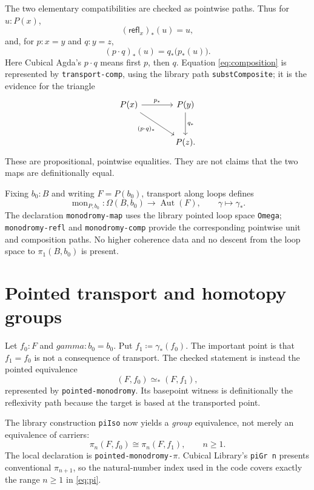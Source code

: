 \documentclass[11pt,reqno]{amsart}
\theoremstyle{mytheorem}
\theoremstyle{mydefinition}
\DeclareMathOperator{\Aut}{Aut}
\newcommand{\ag}[1]{\texttt{#1}}
\begin{document}
The two elementary compatibilities are checked as pointwise paths.  Thus for
$u:P(x)$,
\begin{equation}\label{eq:unit}
 (\mathsf{refl}_x)_*(u)=u,
\end{equation}
and, for $p:x=y$ and $q:y=z$,
\begin{equation}\label{eq:composition}
 (p\mathbin\cdot q)_*(u)=q_*\bigl(p_*(u)\bigr).
\end{equation}
Here Cubical Agda's $p\mathbin\cdot q$ means first $p$, then $q$.  Equation
\eqref{eq:composition} is represented by \ag{transport-comp}, using the
library path \ag{substComposite}; it is the evidence for the triangle
\[
\begin{tikzcd}[column sep=large,row sep=large]
 P(x) \arrow[r,"p_*"] \arrow[dr,"(p\cdot q)_*"'] & P(y) \arrow[d,"q_*"]\\
 & P(z).
\end{tikzcd}
\]
These are propositional, pointwise equalities.  They are not claims that the
two maps are definitionally equal.

Fixing $b_0:B$ and writing $F=P(b_0)$, transport along loops defines
\begin{equation}\label{eq:monodromy}
 \operatorname{mon}_{P,b_0}:\Omega(B,b_0)\longrightarrow\Aut(F),
 \qquad \gamma\longmapsto\gamma_*.
\end{equation}
The declaration \ag{monodromy-map} uses the library pointed loop space
\ag{Omega}; \ag{monodromy-refl} and \ag{monodromy-comp} provide the
corresponding pointwise unit and composition paths.  No higher coherence data
and no descent from the loop space to $\pi_1(B,b_0)$ is present.

\section{Pointed transport and homotopy groups}

Let $f_0:F$ and $gamma:b_0=b_0$.  Put $f_1\coloneqq\gamma_*(f_0)$.  The
important point is that $f_1=f_0$ is not a consequence of transport.  The
checked statement is instead the pointed equivalence
\begin{equation}\label{eq:pointed}
 (F,f_0)\simeq_*(F,f_1),
\end{equation}
represented by \ag{pointed-monodromy}.  Its basepoint witness is definitionally
the reflexivity path because the target is based at the transported point.

The library construction \ag{piIso} now yields a \emph{group} equivalence,
not merely an equivalence of carriers:
\begin{equation}\label{eq:pi}
 \pi_n(F,f_0)\cong\pi_n(F,f_1),\qquad n\geq1.
\end{equation}
The local declaration is \ag{pointed-monodromy-}\ensuremath{\pi}.  Cubical Library's
\ag{piGr n} presents conventional $\pi_{n+1}$, so the natural-number index
used in the code covers exactly the range $n\geq1$ in \eqref{eq:pi}.
\end{document}

